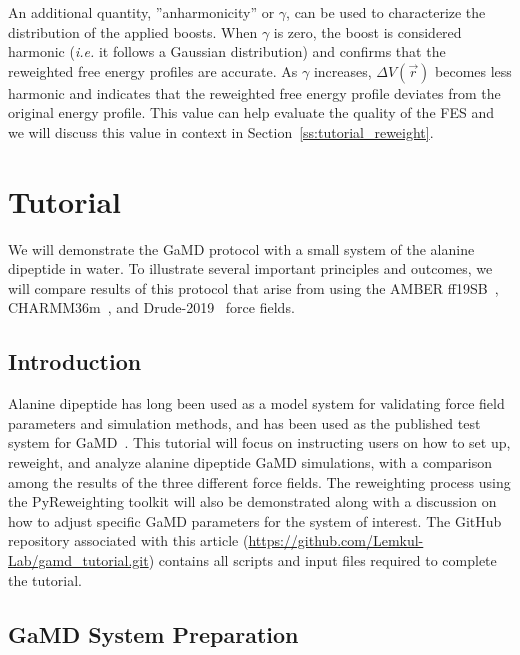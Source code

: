 \documentclass[9pt,tutorial,pubversion]{livecoms}
\newcommand{\githubrepository}{\url{https://github.com/Lemkul-Lab/gamd_tutorial.git}}  %
\begin{document}
An additional quantity, ''anharmonicity'' or $\gamma$, can be used to characterize the distribution of the applied boosts. When $\gamma$ is zero, the boost is considered harmonic (\textit{i.e.} it follows a Gaussian distribution) and confirms that the reweighted free energy profiles are accurate. As $\gamma$ increases, $\Delta{V(\vec{r})}$ becomes less harmonic and indicates that the reweighted free energy profile deviates from the original energy profile. This value can help evaluate the quality of the FES and we will discuss this value in context in Section~\ref{ss:tutorial_reweight}.

\section{Tutorial} 
\label{sec:tutorial}
We will demonstrate the GaMD protocol with a small system of the alanine dipeptide in water. To illustrate several important principles and outcomes, we will compare results of this protocol that arise from using the AMBER ff19SB~\cite{tian_ff19sb_2020}, CHARMM36m~\cite{huang_charmm36m_2017}, and Drude-2019~\cite{lin_further_2020} force fields. 

\subsection{Introduction}
Alanine dipeptide has long been used as a model system for validating force field parameters and simulation methods, and has been used as the published test system for GaMD~\cite{miao_gaussian_2015, pang_gaussian_2017, copeland_gaussian_2022}. This tutorial will focus on instructing users on how to set up, reweight, and analyze alanine dipeptide GaMD simulations, with a comparison among the results of the three different force fields. The reweighting process using the PyReweighting toolkit will also be demonstrated along with a discussion on how to adjust specific GaMD parameters for the system of interest. The GitHub repository associated with this article (\githubrepository) contains all scripts and input files required to complete the tutorial.

\subsection{GaMD System Preparation} 
\end{document}
